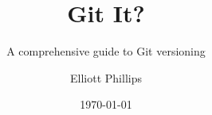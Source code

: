 \title{Git It?}
\subtitle{A comprehensive guide to Git versioning}
\author{Elliott Phillips}
\date{\today}

\frontpage

%
{ %
	\makeatletter
	\@twosidetrue
	\@openrighttrue
	\makeatother
	
	\ifodd\thepage\relax\else\blankpage\fi
	
	
	\setcounter{page}{1}
}






